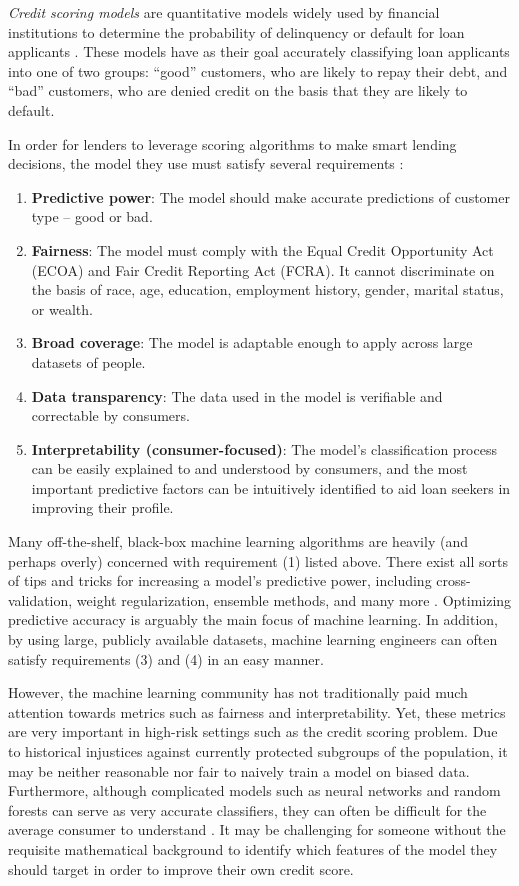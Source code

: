 \documentclass[11pt, margin=1in]{article}
\begin{document}
\textit{Credit scoring models} are quantitative models widely used by financial institutions to determine the probability of delinquency or default for loan applicants \cite{nn-scoring-models}. These models have as their goal accurately classifying loan applicants into one of two groups: ``good'' customers, who are likely to repay their debt, and ``bad'' customers, who are denied credit on the basis that they are likely to default.

In order for lenders to leverage scoring algorithms to make smart lending decisions, the model they use must satisfy several requirements \cite{fico-criteria}:
\begin{enumerate}
	\item \textbf{Predictive power}: The model should make accurate predictions of customer type -- good or bad.
	\item \textbf{Fairness}: The model must comply with the Equal Credit Opportunity Act (ECOA) and Fair Credit Reporting Act (FCRA). It cannot discriminate on the basis of race, age, education, employment history, gender, marital status, or wealth.
	\item \textbf{Broad coverage}: The model is adaptable enough to apply across large datasets of people.
	\item \textbf{Data transparency}: The data used in the model is verifiable and correctable by consumers.
	\item \textbf{Interpretability (consumer-focused)}: The model's classification process can be easily explained to and understood by consumers, and the most important predictive factors can be intuitively identified to aid loan seekers in improving their profile.
\end{enumerate}

Many off-the-shelf, black-box machine learning algorithms are heavily (and perhaps overly) concerned with requirement (1) listed above.  There exist all sorts of tips and tricks for increasing a model's predictive power, including cross-validation, weight regularization, ensemble methods, and many more \cite{ml-review}.  Optimizing predictive accuracy is arguably the main focus of machine learning.  In addition, by using large, publicly available datasets, machine learning engineers can often satisfy requirements (3) and (4) in an easy manner.  

However, the machine learning community has not traditionally paid much attention towards metrics such as fairness and interpretability.  Yet, these metrics are very important in high-risk settings such as the credit scoring problem.  Due to historical injustices against currently protected subgroups of the population, it may be neither reasonable nor fair to naively train a model on biased data.  Furthermore, although complicated models such as neural networks and random forests can serve as very accurate classifiers, they can often be difficult for the average consumer to understand \cite{nn-interpretable}.  It may be challenging for someone without the requisite mathematical background to identify which features of the model they should target in order to improve their own credit score.  
\end{document}
